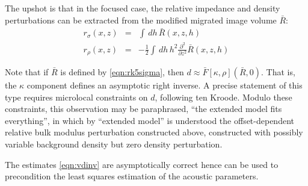 The upshot is that in the focused case, the relative impedance and
density perturbations  can be extracted from the modified migrated
image volume $\bar{R}$:
\begin{eqnarray}
r_{\sigma}(x,z) &=& \int \, dh \, \bar{R}(x,z,h) \nonumber \\
r_{\rho}(x,z) &=& -\frac{1}{2}\int \, dh \,h^2
                  \frac{\partial^2}{\partial z^2}\bar{R}(x,z,h) 
\label{eqn:vdinv}
\end{eqnarray}

Note that if $\bar{R}$ is defined by \ref{eqn:rk5sigma}, then $d \approx
\bar{F}[\kappa,\rho](\bar{R},0)$. That is, the $\kappa$ component
defines an asymptotic right inverse. A precise statement of this type requires microlocal
constraints on $d$, following ten Kroode. Modulo these constraints,
this observation may be paraphrased, ``the extended
model fits everything'', in which by ``extended model'' is understood
the offset-dependent relative bulk modulus perturbation constructed
above, constructed with possibly variable background density
but zero density perturbation.

The estimates \ref{eqn:vdinv} are asymptotically correct hence can be
used to precondition the least squares estimation of the acoustic parameters.




